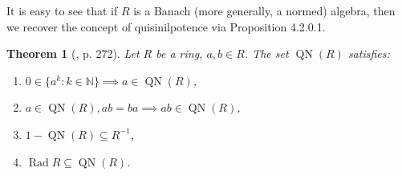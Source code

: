 \documentclass[12pt, oneside]{book}
\newtheorem{theorem}{Theorem}[subsection]
\def\Rad{\operatorname{Rad}}
\def\QN{\operatorname{QN}}
\begin{document}
\noindent It is easy to see that if $R$ is a Banach (more generally, a normed) algebra, then we recover the concept of quisinilpotence via Proposition 4.2.0.1.

\begin{theorem}[\cite{CH3}, p. 272] 
\normalfont
\noindent Let $R$ be a ring, $a, b \in R$. The set $\QN(R)$ satisfies:
\begin{enumerate}[label=(\alph*)]
\item $0 \in \{ a^k: k \in \mathbb{N} \} \implies a \in \QN(R)$,
\item $a \in \QN(R), ab = ba \implies ab \in \QN(R)$,
\item $1-\QN(R) \subseteq R^{-1}$,
\item $\Rad R \subseteq \QN(R)$.
\end{enumerate}
\end{theorem}
\end{document}
